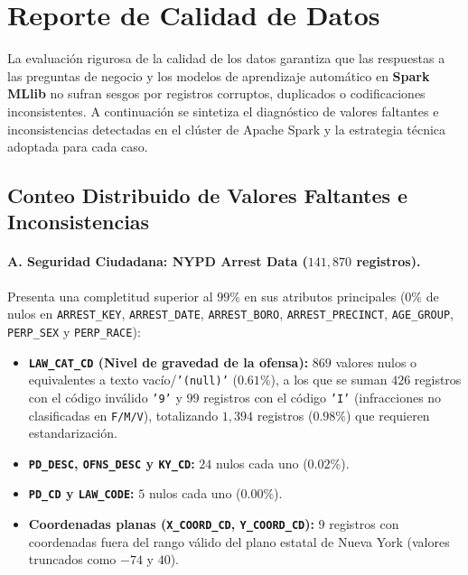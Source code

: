 \section{Reporte de Calidad de Datos}
\label{sec:reporte_calidad}

La evaluación rigurosa de la calidad de los datos garantiza que las respuestas a las preguntas de negocio y los modelos de aprendizaje automático en \textbf{Spark MLlib} no sufran sesgos por registros corruptos, duplicados o codificaciones inconsistentes. A continuación se sintetiza el diagnóstico de valores faltantes e inconsistencias detectadas en el clúster de Apache Spark y la estrategia técnica adoptada para cada caso.

\subsection{Conteo Distribuido de Valores Faltantes e Inconsistencias}
\label{subsec:conteo_faltantes}

\paragraph{A. Seguridad Ciudadana: NYPD Arrest Data ($141,870$ registros).}
Presenta una completitud superior al $99\%$ en sus atributos principales ($0\%$ de nulos en \texttt{ARREST\_KEY}, \texttt{ARREST\_DATE}, \texttt{ARREST\_BORO}, \texttt{ARREST\_PRECINCT}, \texttt{AGE\_GROUP}, \texttt{PERP\_SEX} y \texttt{PERP\_RACE}):
\begin{itemize}
    \item \textbf{\texttt{LAW\_CAT\_CD} (Nivel de gravedad de la ofensa):} $869$ valores nulos o equivalentes a texto vacío/\texttt{'(null)'} ($0.61\%$), a los que se suman $426$ registros con el código inválido \texttt{'9'} y $99$ registros con el código \texttt{'I'} (infracciones no clasificadas en \texttt{F/M/V}), totalizando $1,394$ registros ($0.98\%$) que requieren estandarización.
    \item \textbf{\texttt{PD\_DESC}, \texttt{OFNS\_DESC} y \texttt{KY\_CD}:} $24$ nulos cada uno ($0.02\%$).
    \item \textbf{\texttt{PD\_CD} y \texttt{LAW\_CODE}:} $5$ nulos cada uno ($0.00\%$).
    \item \textbf{Coordenadas planas (\texttt{X\_COORD\_CD}, \texttt{Y\_COORD\_CD}):} $9$ registros con coordenadas fuera del rango válido del plano estatal de Nueva York (valores truncados como $-74$ y $40$).
\end{itemize}

